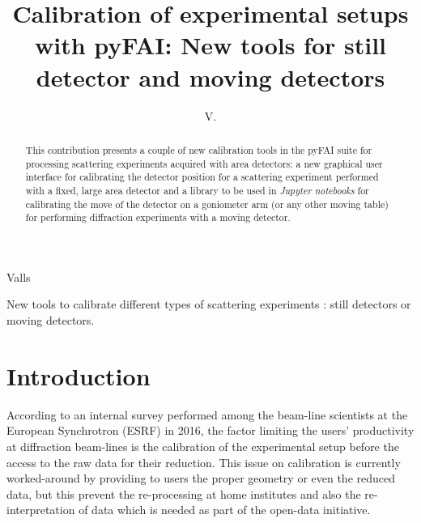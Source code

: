 \documentclass[preprint, pdf]{iucr}              %
\begin{document}

\title{Calibration of experimental setups with {pyFAI}: New tools for still
detector and moving detectors}

 \author[a]{V.}{Valls}
 
 





\maketitle                        %

\begin{synopsis}
New tools to calibrate different types of scattering experiments : still
detectors or moving detectors.
\end{synopsis}

\begin{abstract}


This contribution presents a couple of new calibration tools in the pyFAI suite
for processing scattering experiments acquired with area detectors:
a new graphical user interface for calibrating the detector position for a 
scattering experiment performed with a fixed, large area detector and
a library to be used in \textit{Jupyter notebooks} for calibrating the move of the
detector on a goniometer arm (or any other moving table) for performing
diffraction experiments with a moving detector.
\end{abstract}


\section{Introduction}

According to an internal survey performed among the beam-line scientists at
the European Synchrotron (ESRF) in 2016, the factor limiting the users'
productivity at diffraction beam-lines is the calibration of the experimental
setup before the access to the raw data for their reduction. 
This issue on calibration is currently worked-around by providing to users the
proper geometry or even the reduced data, but this prevent the
re-processing at home institutes and also the re-interpretation of data which
is needed as part of the open-data initiative.
\end{document}
